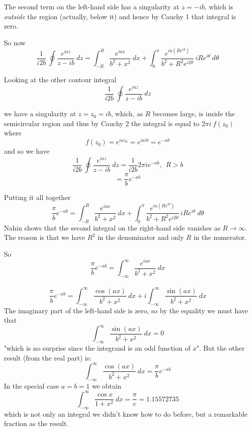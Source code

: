 \documentclass[11pt, oneside]{article}   	%
\begin{document}
The second term on the left-hand side has a singularity at $z = -ib$, which is \emph{outside} the region (actually, below it) and hence by Cauchy 1 that integral is zero.

So now
\[ \frac{1}{i2b} \ \oint \frac{e^{iaz}}{z-ib} \ dz  = \int_{-R}^R \frac{e^{iax}}{b^2 + x^2} \ dx + \int_0^{\pi}  \frac{e^{ia(Re^{i\theta})}}{b^2 + R^2e^{i2\theta}}  \ iRe^{i\theta} \ d \theta \]

Looking at the other contour integral 
\[ \frac{1}{i2b} \ \oint \frac{e^{iaz}}{z-ib} \ dz  \]

we have a singularity at $z = z_0 = ib$, which, as $R$ becomes large, is inside the semicircular region and thus by Cauchy 2 the integral is equal to $2 \pi i \ f(z_0)$ where
\[ f(z_0) = e^{iaz_0} = e^{iaib} = e^{-ab} \]
and so we have
\[ \frac{1}{i2b} \ \oint \frac{e^{iaz}}{z-ib} \ dz = \frac{1}{i2b} 2 \pi i e^{-ab}, \ \ R > b \]
\[ = \frac{\pi}{b} e^{-ab} \]

Putting it all together
\[ \frac{\pi}{b} e^{-ab} = \int_{-R}^R \frac{e^{iax}}{b^2 + x^2} \ dx + \int_0^{\pi}  \frac{e^{ia(Re^{i\theta})}}{b^2 + R^2e^{i2\theta}}  \ iRe^{i\theta} \ d \theta \]
Nahin shows that the second integral on the right-hand side vanishes as $R \rightarrow \infty$.  The reason is that we have $R^2$ in the denominator and only $R$ in the numerator.

So
\[ \frac{\pi}{b} e^{-ab} = \int_{-\infty}^{\infty} \frac{e^{iax}}{b^2 + x^2} \ dx \]\
\[ \frac{\pi}{b} e^{-ab} = \int_{-\infty}^{\infty} \frac{\cos(ax)}{b^2 + x^2} \ dx + i  \int_{-\infty}^{\infty} \frac{\sin(ax)}{b^2 + x^2} \ dx \]
The imaginary part of the left-hand side is zero, so by the equality we must have that
\[ \int_{-\infty}^{\infty} \frac{\sin(ax)}{b^2 + x^2} \ dx = 0 \]
"which is no surprise since the integrand is an odd function of $x$".  But the other result (from the real part) is:
\[ \int_{-\infty}^{\infty} \frac{\cos(ax)}{b^2 + x^2} \ dx = \frac{\pi}{b} e^{-ab} \]
In the special case $a = b = 1$ we obtain
\[ \int_{-\infty}^{\infty} \frac{\cos x }{1 + x^2} \ dx = \frac{\pi}{e} = 1.15572735 \]
which is not only an integral we didn't know how to do before, but a remarkable fraction as the result.
\end{document}
